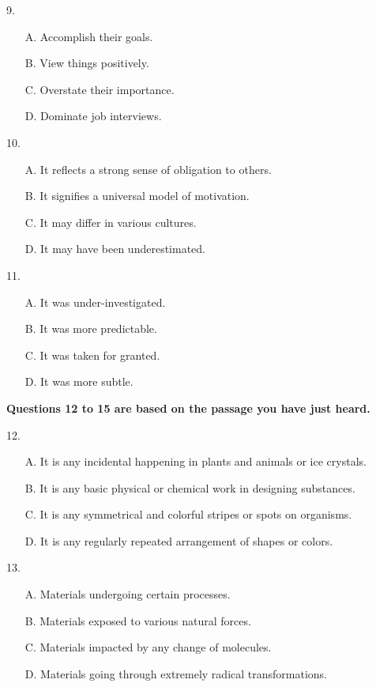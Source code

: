 \documentclass[UTF8,11pt]{ctexart}
\begin{document}
9.


\begin{itemize}[leftmargin=2em,itemsep=.2em,topsep=.4em]\item[A.] Accomplish their goals.
\item[B.] View things positively.
\item[C.] Overstate their importance.
\item[D.] Dominate job interviews.
\end{itemize}

10.


\begin{itemize}[leftmargin=2em,itemsep=.2em,topsep=.4em]\item[A.] It reflects a strong sense of obligation to others.
\item[B.] It signifies a universal model of motivation.
\item[C.] It may differ in various cultures.
\item[D.] It may have been underestimated.
\end{itemize}

11.


\begin{itemize}[leftmargin=2em,itemsep=.2em,topsep=.4em]\item[A.] It was under-investigated.
\item[B.] It was more predictable.
\item[C.] It was taken for granted.
\item[D.] It was more subtle.
\end{itemize}

\textbf{Questions 12 to 15 are based on the passage you have just heard.}


12.


\begin{itemize}[leftmargin=2em,itemsep=.2em,topsep=.4em]\item[A.] It is any incidental happening in plants and animals or ice crystals.
\item[B.] It is any basic physical or chemical work in designing substances.
\item[C.] It is any symmetrical and colorful stripes or spots on organisms.
\item[D.] It is any regularly repeated arrangement of shapes or colors.
\end{itemize}

13.


\begin{itemize}[leftmargin=2em,itemsep=.2em,topsep=.4em]\item[A.] Materials undergoing certain processes.
\item[B.] Materials exposed to various natural forces.
\item[C.] Materials impacted by any change of molecules.
\item[D.] Materials going through extremely radical transformations.
\end{itemize}
\end{document}
